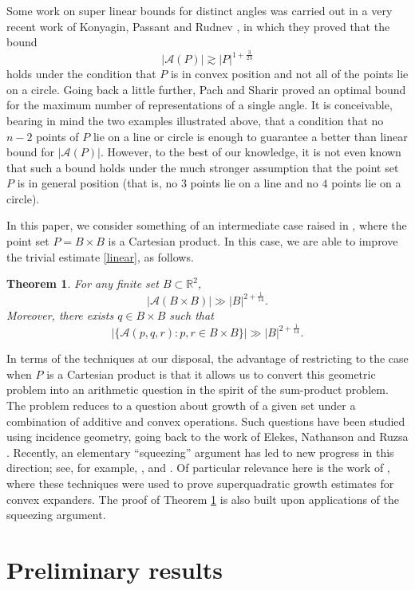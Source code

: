 \documentclass[11pt,oneside]{amsart}
\numberwithin{exercise}{subsection}
\newtheorem{theorem}{Theorem}
\begin{document}
Some work on super linear bounds for distinct angles was carried out in a very recent work of Konyagin, Passant and Rudnev \cite{KPR}, in which they proved that the bound
\[
|\mathcal A(P)| \gtrsim  |P|^{1+\frac{3}{23}}
\]
holds under the condition that $P$ is in convex position and not all of the points lie on a circle. Going back a little further, Pach and Sharir \cite{PS} proved an optimal bound for the maximum number of representations of a single angle. It is conceivable, bearing in mind the two examples illustrated above, that a condition that no $n-2$ points of $P$ lie on a line or circle is enough to guarantee a better than linear bound for $|\mathcal A(P)|$. However, to the best of our knowledge, it is not even known that such a bound holds under the much stronger assumption that the point set $P$ is in general position (that is, no $3$ points lie on a line and no $4$ points lie on a circle).

In this paper, we consider something of an intermediate case raised in \cite{KPR}, where the point set $P=B \times B$ is a Cartesian product. In this case, we are able to improve the trivial estimate \eqref{linear}, as follows.

\begin{theorem} \label{thm:main}
 For any finite set $B \subset \mathbb R^2$,
\[
|\mathcal A(B \times B)| \gg |B|^{2+\frac{1}{14}}.
\]
Moreover, there exists $q \in B \times B$ such that
\[
|\{ \mathcal A(p,q,r) : p,r \in B \times B \}| \gg |B|^{2+\frac{1}{14}}.
\]
\end{theorem}

In terms of the techniques at our disposal, the advantage of restricting to the case when $P$ is a Cartesian product is that it allows us to convert this geometric problem into an arithmetic question in the spirit of the sum-product problem. The problem reduces to a question about growth of a given set under a combination of additive and convex operations. Such questions have been studied using incidence geometry, going back to the work of Elekes, Nathanson and Ruzsa \cite{ENR}. Recently, an elementary ``squeezing'' argument has led to new progress in this direction; see, for example, \cite{RSSS}, \cite{HRNR} and \cite{B}. Of particular relevance here is the work of \cite{HRNS}, where these techniques were used to prove superquadratic growth estimates for convex expanders. The proof of Theorem \ref{thm:main} is also built upon applications of the squeezing argument.

\section{Preliminary results}
\end{document}

